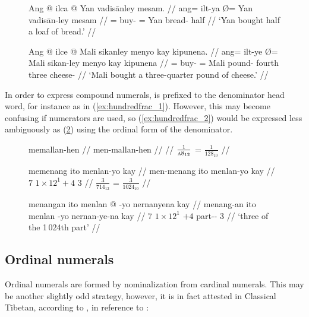 \begin{figure}[h]
\pex\label{ex:simplefrac}
\a\begingl
	\gla Ang @ ilca {} @ Yan vadisānley mesam. //
	\glb ang= ilt-ya Ø= Yan vadisān-ley mesam //
	\glc \AgtT{}= buy-\TsgM{} \Top{}= Yan bread-\PargI{} half //
	\glft `Yan bought half a loaf of bread.' //
\endgl

\a\begingl
	\gla Ang @ ilce {} @ Mali sikanley menyo kay kipunena. //
	\glb ang= ilt-ye Ø= Mali sikan-ley menyo kay kipunena //
	\glc \AgtT{}= buy-\TsgM{} \Top{}= Mali pound-\PargI{} fourth three
		cheese-\Gen{} //
	\glft `Mali bought a three-quarter pound of cheese.' //
\endgl
\xe
\end{figure}

In order to express compound numerals,  is prefixed to the
denominator head word, for instance as in (\ref{ex:hundredfrac_1}). However,
this may become confusing if numerators are used, so (\ref{ex:hundredfrac_2})
would be expressed less ambiguously as (\ref{ex:hundredfrac_3}) using the
ordinal form of the denominator.

\begin{figure}[h]
\pex
\a\label{ex:hundredfrac_1}\begingl
	\gla memallan-hen //
	\glb men-mallan-hen //
	 //
	\glft $\frac{1}{\textsc{a}8_{12}}$ = $\frac{1}{128_{10}}$ //
\endgl

\a\label{ex:hundredfrac_2}\ljudge\ques\begingl
	\gla memenang ito menlan-yo kay //
	\glb men-menang ito menlan-yo kay //
	 {$7$} {$1 \times 12^1 + 4$} {$3$} //
	\glft $\frac{3}{714_{12}}$ = $\frac{3}{1024_{10}}$ //
\endgl

\a\label{ex:hundredfrac_3}\begingl
	\gla menangan ito menlan @ -yo nernanyena kay //
	\glb menang-an ito menlan -yo nernan-ye-na kay //
	 {$7$} {$1 \times 12^1$} {$+4$} part-\Pl{}-\Gen{} 
		$3$ //
	\glft `three of the 1\,024th part' //
\endgl
\xe
\end{figure}

\subsection{Ordinal numerals}

Ordinal numerals are formed by nominalization from cardinal numerals. This may 
be another slightly odd strategy, however, it is in fact attested in Classical 
Tibetan, according to \citet{chungetal2014}, in reference to \citet{beyer1992}:

